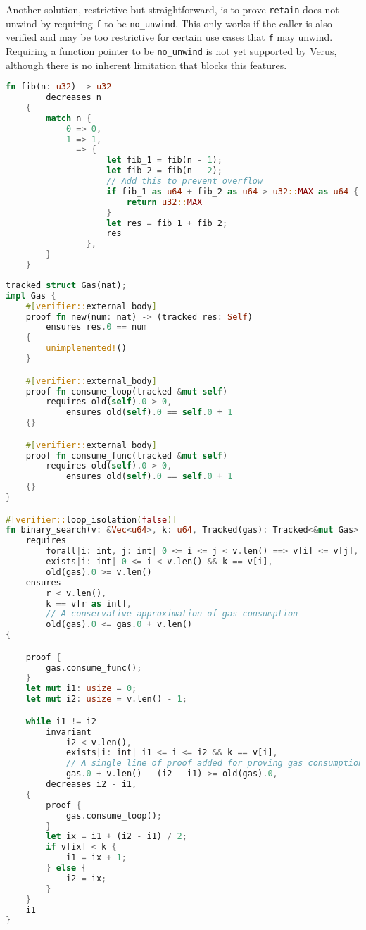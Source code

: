 \documentclass[conference]{IEEEtran}
\begin{document}
Another solution, restrictive but straightforward, is to prove \texttt{retain} does not unwind by requiring \texttt{f} to be \texttt{no\_unwind}. This only works if the caller is also verified and may be too restrictive for certain use cases that \texttt{f} may unwind. Requiring a function pointer to be \texttt{no\_unwind} is not yet supported by Verus, although there is no inherent limitation that blocks this features.   

\begin{lstlisting}[language=Rust,style=colouredRust, caption={decreases example}, label = {6}]
    fn fib(n: u32) -> u32 
        decreases n 
    {
        match n {
            0 => 0,
            1 => 1,
            _ => {
                    let fib_1 = fib(n - 1); 
                    let fib_2 = fib(n - 2);
                    // Add this to prevent overflow
                    if fib_1 as u64 + fib_2 as u64 > u32::MAX as u64 {
                        return u32::MAX
                    }
                    let res = fib_1 + fib_2;
                    res
                },
        }
    }
\end{lstlisting}

\begin{lstlisting}[language=Rust,style=colouredRust, caption={Linear Ghost Type for Tracking Complexity}, label = {7}]
tracked struct Gas(nat);
impl Gas {
    #[verifier::external_body]
    proof fn new(num: nat) -> (tracked res: Self) 
        ensures res.0 == num
    {
        unimplemented!()
    }

    #[verifier::external_body]
    proof fn consume_loop(tracked &mut self)
        requires old(self).0 > 0,
            ensures old(self).0 == self.0 + 1
    {}

    #[verifier::external_body]
    proof fn consume_func(tracked &mut self)
        requires old(self).0 > 0,
            ensures old(self).0 == self.0 + 1
    {}
}

#[verifier::loop_isolation(false)]
fn binary_search(v: &Vec<u64>, k: u64, Tracked(gas): Tracked<&mut Gas>) -> (r: usize)
    requires
        forall|i: int, j: int| 0 <= i <= j < v.len() ==> v[i] <= v[j],
        exists|i: int| 0 <= i < v.len() && k == v[i],
        old(gas).0 >= v.len()
    ensures
        r < v.len(),
        k == v[r as int],
        // A conservative approximation of gas consumption
        old(gas).0 <= gas.0 + v.len()
{

    proof {
        gas.consume_func();
    }
    let mut i1: usize = 0;
    let mut i2: usize = v.len() - 1;

    while i1 != i2
        invariant
            i2 < v.len(),
            exists|i: int| i1 <= i <= i2 && k == v[i],
            // A single line of proof added for proving gas consumption
            gas.0 + v.len() - (i2 - i1) >= old(gas).0,
        decreases i2 - i1,
    {
        proof {
            gas.consume_loop();
        }
        let ix = i1 + (i2 - i1) / 2;
        if v[ix] < k {
            i1 = ix + 1;
        } else {
            i2 = ix;
        }
    }
    i1
}
\end{lstlisting}
\end{document}
